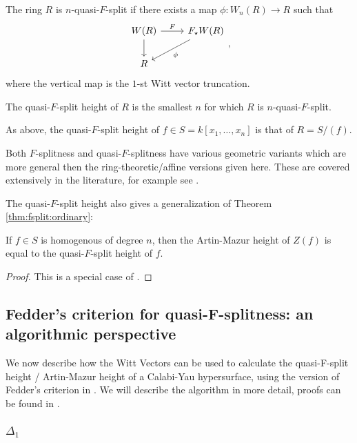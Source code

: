 \begin{defn}
	The ring \(R\) is \(n\)-quasi-\(F\)-split if there exists
	a map \(\phi \colon W_{n}(R) \xrightarrow{} R\) such that
	\[
	\begin{tikzcd}
		W(R) \arrow{r}{F} \arrow{d}[swap]{} &
		F_{\star}W(R) \arrow{ld}{\phi} \\
	R 
	\end{tikzcd}
	,\]
	where the vertical map is the \(1\)-st Witt vector truncation.

	The quasi-\(F\)-split height of \(R\) is the smallest \(n\) 
	for which \(R\) is \(n\)-quasi-\(F\)-split.

	As above, the quasi-\(F\)-split height of 
	\(f \in S = k[x_{1}, \ldots, x_{n}]\) is that
	of \(R = S / (f)\).
\end{defn}

\begin{rmk}
	Both \(F\)-splitness and quasi-\(F\)-splitness have 
	various geometric
	variants which are more general then the 
	ring-theoretic/affine versions given here. 
	These are covered extensively in the literature, for example
	see \cite{kttwyy-2022-qfs-birat}.
\end{rmk}

The quasi-\(F\)-split height also gives a generalization
of Theorem \ref{thm:fsplit:ordinary}:

\begin{thm}
	If \(f \in S\) is homogenous of degree \(n\),
	then the Artin-Mazur height of \(Z(f)\)
	is equal to the quasi-\(F\)-split height
	of \(f\).
\end{thm}

\begin{proof}
	This is a special case of 
	\cite[Theorem~4.5]{yobuko-2019-qfs-calabi-yau}.
\end{proof}

\subsection{Fedder's criterion for quasi-F-splitness: an algorithmic perspective}

We now describe how the Witt Vectors can be used to calculate the 
quasi-F-split height / Artin-Mazur height of a Calabi-Yau 
hypersurface, using the version of Fedder's criterion in \cite{quasifedder}.
We will describe the algorithm in more detail, proofs can be
found in \cite{quasifedder}.

\subsubsection{\(\Delta_{1}\)}

